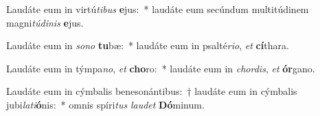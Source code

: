 \item Laudáte eum in virtú\textit{ti}\textit{bus} \textbf{e}jus:~* laudáte eum secúndum multitúdinem magni\textit{tú}\textit{di}\textit{nis} \textbf{e}jus.
\item Laudáte eum in \textit{so}\textit{no} \textbf{tu}bæ:~* laudáte eum in psalté\textit{ri}\textit{o}, \textit{et} \textbf{cí}thara.
\item Laudáte eum in týmpa\textit{no}, \textit{et} \textbf{cho}ro:~* laudáte eum in \textit{chor}\textit{dis}, \textit{et} \textbf{ór}gano.
\item Laudáte eum in cýmbalis benesonántibus:~† laudáte eum in cýmbalis jubi\textit{la}\textit{ti}\textbf{ó}nis:~* omnis spíri\textit{tus} \textit{lau}\textit{det} \textbf{Dó}minum.
